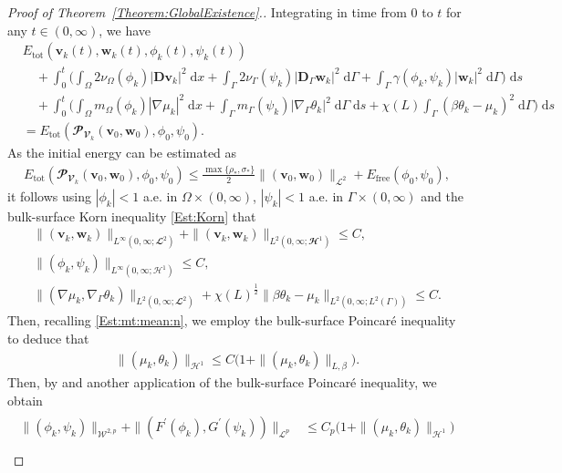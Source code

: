 \documentclass[10pt,reqno]{amsart}
\theoremstyle{remark}
\numberwithin{equation}{section}
\newcommand{\abs}[1]{| #1 |}
\newcommand{\norm}[1]{\| #1 \|}
\newcommand{\bv}{\mathbf{v}}
\newcommand{\bw}{\mathbf{w}}
\newcommand{\D}{\mathbf{D}}
\newcommand{\Dg}{\mathbf{D}_\Gamma}
\newcommand{\intO}{\int_\Omega}
\newcommand{\intG}{\int_\Gamma}
\newcommand{\dx}{\;\mathrm{d}x}
\newcommand{\ds}{\;\mathrm ds}
\newcommand{\dGs}{\;\mathrm{d}\Ga\;\mathrm{d}s}
\newcommand{\dG}{\;\mathrm d\Ga}
\newcommand{\Grad}{\nabla}
\newcommand{\Gradg}{\nabla_\Ga}
\newcommand{\Om}{\Omega}
\newcommand{\Ga}{\Gamma}
\begin{document}
\begin{proof}[Proof of Theorem~\ref{Theorem:GlobalExistence}.]
Integrating in time from $0$ to $t$ for any $t\in(0,\infty)$, we have
\begin{align*}
    &E_{\mathrm{tot}}(\bv_k(t),\bw_k(t),\phi_k(t),\psi_k(t)) \\
    &\quad + \int_0^t\Bigg(\intO 2\nu_\Om(\phi_k)\abs{\D\bv_k}^2\dx + \intG 2\nu_\Ga(\psi_k)\abs{\Dg\bw_k}^2\dG + \intG \gamma(\phi_k,\psi_k)\abs{\bw_k}^2\dG\Bigg)\ds \\
    &\quad + \int_0^t\Bigg(\intO m_\Om(\phi_k)\abs{\Grad\mu_k}^2\dx + \intG m_\Ga(\psi_k)\abs{\Gradg\theta_k}^2\dGs + \chi(L)\intG (\beta\theta_k - \mu_k)^2\dG\Bigg)\ds \\
    &= E_{\mathrm{tot}}(\mathbfcal{P}_{\mathbfcal{V}_k}(\bv_0,\bw_0),\phi_0,\psi_0).
\end{align*}
As the initial energy can be estimated as
\begin{align*}
    E_{\mathrm{tot}}(\mathbfcal{P}_{\mathbfcal{V}_k}(\bv_0,\bw_0),\phi_0,\psi_0) \leq \frac{\max\{\rho_\ast,\sigma_\ast\}}{2}\norm{(\bv_0,\bw_0)}_{\mathcal{L}^2} + E_{\mathrm{free}}(\phi_0,\psi_0),
\end{align*}
it follows using $\abs{\phi_k} < 1$ a.e. in $\Om\times(0,\infty)$, $\abs{\psi_k} < 1$ a.e. in $\Ga\times(0,\infty)$ and the bulk-surface Korn inequality \eqref{Est:Korn} that
\begin{align}
    \norm{(\bv_k,\bw_k)}_{L^\infty(0,\infty;\mathbfcal{L}^2)} + \norm{(\bv_k,\bw_k)}_{L^2(0,\infty;\mathbfcal{H}^1)}\leq C, \label{Est:vw:Energy}\\
    \norm{(\phi_k,\psi_k)}_{L^\infty(0,\infty;\mathcal{H}^1)} \leq C, \label{Est:pp:Energy} \\
    \norm{(\Grad\mu_k,\Gradg\theta_k)}_{L^2(0,\infty;\mathbfcal{L}^2)} + \chi(L)^{\frac12}\norm{\beta\theta_k - \mu_k}_{L^2(0,\infty;L^2(\Ga))} \leq C \label{Est:mt:Energy}.
\end{align}
Then, recalling \eqref{Est:mt:mean:n}, we employ the bulk-surface Poincar\'{e} inequality to deduce that
\begin{align}\label{Est:mt:H^1:a.e.}
    \norm{(\mu_k,\theta_k)}_{\mathcal{H}^1} \leq C\big(1 + \norm{(\mu_k,\theta_k)}_{L,\beta}\big).
\end{align}
Then, by \cite[Proposition~5.5]{Giorgini2025} and another application of the bulk-surface Poincar\'{e} inequality, we obtain
\begin{align}\label{Est:pp:pot:L^p:a.e.}
    \begin{split}
        \norm{(\phi_k,\psi_k)}_{\mathcal{W}^{2,p}} + \norm{(F^\prime(\phi_k),G^\prime(\psi_k))}_{\mathcal{L}^p} &\leq C_p\big(1 + \norm{(\mu_k,\theta_k)}_{\mathcal{H}^1}\big) \\

\end{split}
\end{align}
\end{proof}
\end{document}
